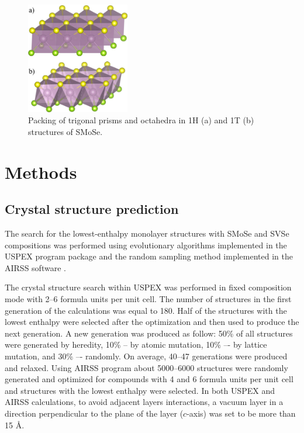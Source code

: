 \documentclass[a4paperm]{article}
\begin{document}
\begin{figure}
        \includegraphics[width=0.4\textwidth]{1H1T.png}
        \caption{Packing of trigonal prisms and octahedra in 1H (a) and 1T (b) structures of SMoSe.}
\label{1H1T}
\end{figure}





		\section{Methods}

\subsection*{Crystal structure prediction}

The search for the lowest-enthalpy monolayer structures with SMoSe and SVSe compositions was performed using evolutionary algorithms implemented in the USPEX program package \cite{uspex1,uspex2,uspex3} and the random sampling method implemented in the AIRSS software \cite{airss1,airss2}.

The crystal structure search within USPEX was performed in fixed composition mode with 2--6 formula units per unit cell.
The number of structures in the first generation of the calculations was equal to 180.
Half of the structures with the lowest enthalpy were selected after the optimization and then used to produce the next generation.
A new generation was produced as follow: 50\% of all structures were generated by heredity, 10\% -- by atomic mutation, 10\% –- by lattice mutation, and 30\% –- randomly.
On average, 40--47 generations were produced and relaxed.
Using AIRSS program about 5000--6000 structures were randomly generated and optimized for compounds with 4 and 6 formula units per unit cell and structures with the lowest enthalpy were selected. 
In both USPEX and AIRSS calculations, to avoid adjacent layers interactions, a vacuum layer in a direction perpendicular to the plane of the layer ($c$-axis) was set to be more than 15 \AA.
 
\end{document}
